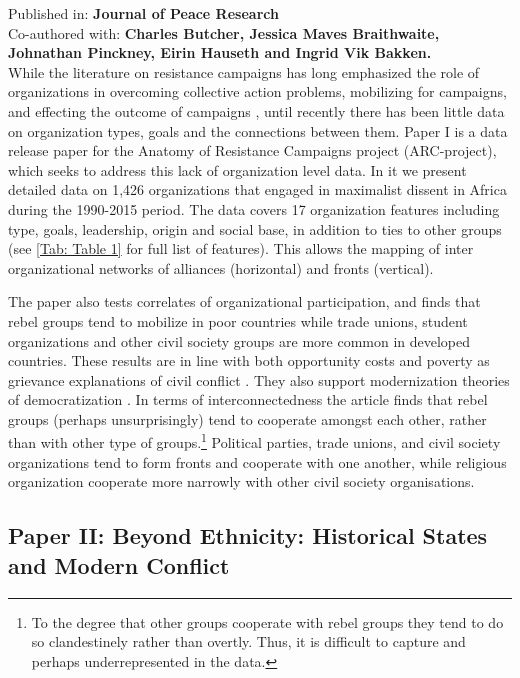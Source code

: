 Published in: \textbf{Journal of Peace Research}\\
Co-authored with: \textbf{Charles Butcher, Jessica Maves Braithwaite,\\
	Johnathan Pinckney, Eirin Hauseth and Ingrid Vik Bakken.}\\

While the literature on resistance campaigns has long emphasized the role of
organizations in overcoming collective action problems, mobilizing for
campaigns, and effecting the outcome of campaigns \citep{Braithwaite2020,
	Brancati2016, Butcher_2014, Celestino_2013, chenoweth2011civil,
HaggardStephan2016DaD:, TarrowSidneyG.2011Pim:}, until recently there has been
little data on organization types, goals and the connections between them. Paper
I is a data release paper for the Anatomy of Resistance Campaigns project
(ARC-project), which seeks to address this lack of organization level data. In
it we present detailed data on 1,426 organizations that engaged in maximalist
dissent in Africa during the 1990-2015 period. The data covers 17 organization
features including type, goals, leadership, origin and social base, in addition
to ties to other groups (see \ref{Tab: Table 1} for full list of features). This
allows the mapping of inter organizational networks of alliances (horizontal) and
fronts (vertical).

The paper also tests correlates of organizational participation, and finds that
rebel groups tend to mobilize in poor countries while trade unions, student
organizations and other civil society groups are more common in developed
countries. These results are in line with both opportunity costs and poverty as
grievance explanations of civil conflict \citep{Collier2009, Davies_1962,
GurrTedRobert1970Wmr}. They also support modernization theories of
democratization \citep{Butcher_2014, Dahlum2019}. In terms of interconnectedness
the article finds that rebel groups (perhaps unsurprisingly) tend to cooperate
amongst each other, rather than with other type of groups.\footnote{To the
degree that other groups cooperate with rebel groups they tend to do so
clandestinely rather than overtly. Thus, it is difficult to capture and perhaps
underrepresented in the data.} Political parties, trade unions, and civil
society organizations tend to form fronts and cooperate with one another, while
religious organization cooperate more narrowly with other civil society
organisations.

\subsection{Paper II: Beyond Ethnicity: Historical States and Modern Conflict}
\label{Paper 2}


